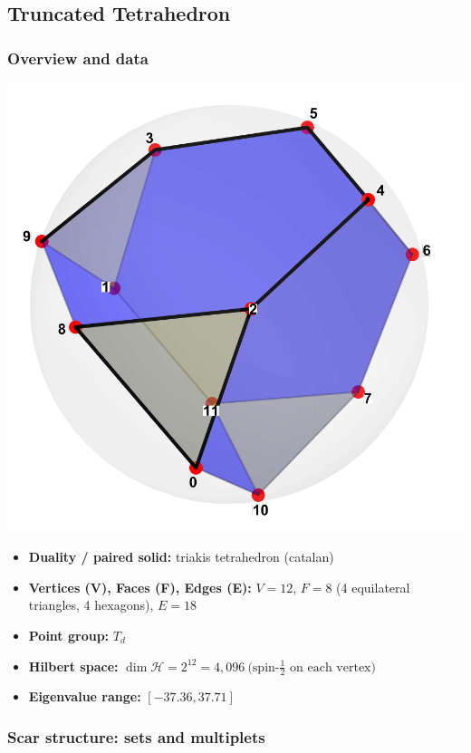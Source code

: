 \documentclass[11pt,a4paper]{article}
\begin{document}

\subsection*{Truncated Tetrahedron}

\subsubsection*{Overview and data}
\begin{center}
  \includegraphics[width=.6\linewidth]{truncatedtetrahedron}
\end{center}

\begin{itemize}[leftmargin=1.5em]
  \item \textbf{Duality / paired solid:} triakis tetrahedron (catalan)
  \item \textbf{Vertices (V), Faces (F), Edges (E):} $V = 12$,\; $F = 8$ (4 equilateral triangles, 4 hexagons),\; $E = 18$
  \item \textbf{Point group:} $T_d$
  \item \textbf{Hilbert space:} \(
        \dim\mathcal{H} = 2^{12} = 4,096\ \text{(spin-$\tfrac12$ on each vertex)}
        \)
  \item \textbf{Eigenvalue range:} $[-37.36, 37.71]$
\end{itemize}

\subsubsection*{Scar structure: sets and multiplets}
\end{document}
